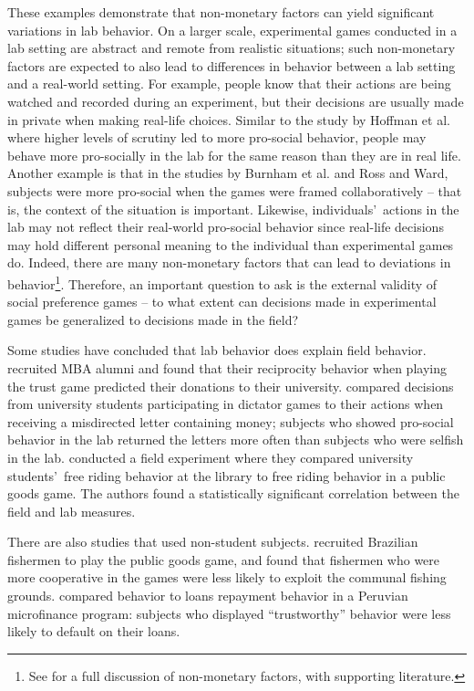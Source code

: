 \documentclass[12pt]{article}
\begin{document}
These examples demonstrate that non-monetary factors can yield significant variations in lab behavior. On a larger scale, experimental games conducted in a lab setting are abstract and remote from realistic situations; such non-monetary factors are expected to also lead to differences in behavior between a lab setting and a real-world setting. For example, people know that their actions are being watched and recorded during an experiment, but their decisions are usually made in private when making real-life choices. Similar to the study by Hoffman et al. where higher levels of scrutiny led to more pro-social behavior, people may behave more pro-socially in the lab for the same reason than they are in real life. Another example is that in the studies by Burnham et al. and Ross and Ward, subjects were more pro-social when the games were framed collaboratively -- that is, the context of the situation is important. Likewise, individuals\rq \ actions in the lab may not reflect their real-world pro-social behavior since real-life decisions may hold different personal meaning to the individual than experimental games do. Indeed, there are many non-monetary factors that can lead to deviations in behavior\footnote{See \cite{levitt_list_2007} for a full discussion of non-monetary factors, with supporting literature.}. Therefore, an important question to ask is the external validity of social preference games -- to what extent can decisions made in experimental games be generalized to decisions made in the field?

Some studies have concluded that lab behavior does explain field behavior. \cite{baran_2010} recruited MBA alumni and found that their reciprocity behavior when playing the trust game predicted their donations to their university. \cite{franzen_pointner_2012} compared decisions from university students participating in dictator games to their actions when receiving a misdirected letter containing money; subjects who showed pro-social behavior in the lab returned the letters more often than subjects who were selfish in the lab. \cite{englmaier_gebhardt_2011} conducted a field experiment where they compared university students\rq \ free riding behavior at the library to free riding behavior in a public goods game. The authors found a statistically significant correlation between the field and lab measures.

There are also studies that used non-student subjects. \cite{fehr_leibbrandt_2011} recruited Brazilian fishermen to play the public goods game, and found that fishermen who were more cooperative in the games were less likely to exploit the communal fishing grounds. \cite{karlan_2005} compared behavior to loans repayment behavior in a Peruvian microfinance program: subjects who displayed ``trustworthy'' behavior were less likely to default on their loans. 
\end{document}
